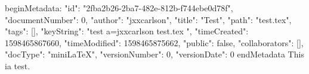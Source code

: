 beginMetadata:
{
    "id": "2fba2b26-2ba7-482e-812b-f744ebe0d78f",
    "documentNumber": 0,
    "author": "jxxcarlson",
    "title": "Test",
    "path": "test.tex",
    "tags": [],
    "keyString": "test a=jxxcarlson test.tex ",
    "timeCreated": 1598465867660,
    "timeModified": 1598465875662,
    "public": false,
    "collaborators": [],
    "docType": "miniLaTeX",
    "versionNumber": 0,
    "versionDate": 0
}
endMetadata
This ia test.